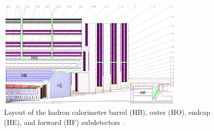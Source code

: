 \begin{figure}
\centering
\includegraphics[width=0.8\textwidth]{figures/lhc_and_cms/hcal_layout.png}
\caption{Layout of the hadron calorimeter barrel (HB), outer (HO), endcap (HE), and forward (HF) subdetectors \cite{cms_experiment}.}
\label{hcal_layout}
\end{figure}
